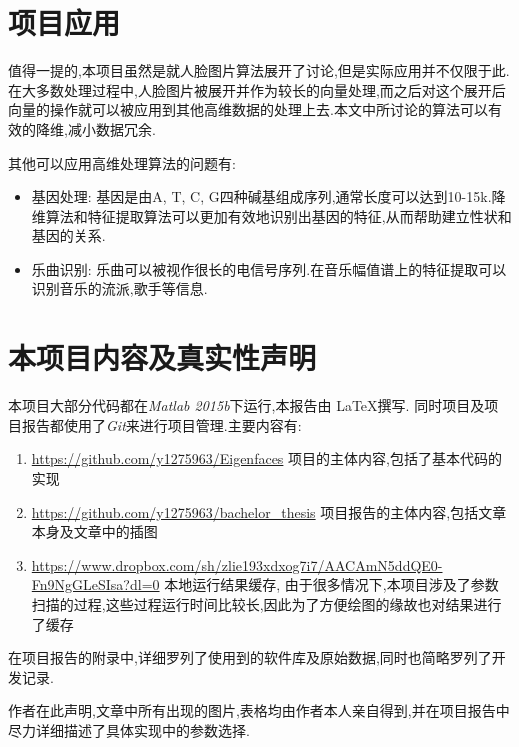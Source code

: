 \section{项目应用}
值得一提的,本项目虽然是就人脸图片算法展开了讨论,但是实际应用并不仅限于此.在大多数处理过程中,人脸图片被展开并作为较长的向量处理,而之后对这个展开后向量的操作就可以被应用到其他高维数据的处理上去.本文中所讨论的算法可以有效的降维,减小数据冗余.\newline


其他可以应用高维处理算法的问题有:

\begin{itemize}
	\item{基因处理: } 基因是由A, T, C, G四种碱基组成序列,通常长度可以达到10-15k\cite{twine2011whole}.降维算法和特征提取算法可以更加有效地识别出基因的特征,从而帮助建立性状和基因的关系.
	\item{乐曲识别:} 乐曲可以被视作很长的电信号序列.在音乐幅值谱上的特征提取可以识别音乐的流派,歌手等信息.
\end{itemize}



\section{本项目内容及真实性声明}

本项目大部分代码都在\textit{Matlab 2015b}下运行,本报告由 \LaTeX 撰写. 同时项目及项目报告都使用了\textit{Git}来进行项目管理.主要内容有:
\begin{enumerate}
	\item \url{https://github.com/y1275963/Eigenfaces} 项目的主体内容,包括了基本代码的实现
	\item \url{https://github.com/y1275963/bachelor_thesis} 项目报告的主体内容,包括文章本身及文章中的插图
	\item \url{https://www.dropbox.com/sh/zlie193xdxog7i7/AACAmN5ddQE0-Fn9NgGLeSIsa?dl=0} 本地运行结果缓存, 由于很多情况下,本项目涉及了参数扫描的过程,这些过程运行时间比较长,因此为了方便绘图的缘故也对结果进行了缓存
\end{enumerate}

在项目报告的附录中,详细罗列了使用到的软件库及原始数据,同时也简略罗列了开发记录.\newline


作者在此声明,文章中所有出现的图片,表格均由作者本人亲自得到,并在项目报告中尽力详细描述了具体实现中的参数选择.

